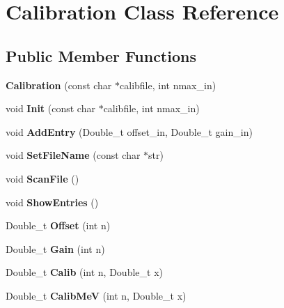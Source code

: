 \hypertarget{classCalibration}{
\section{Calibration Class Reference}
\label{classCalibration}
}
\subsection*{Public Member Functions}
\begin{DoxyCompactItemize}
\item 
\hypertarget{classCalibration_adaaabbe555e8d9719c11c107f159ac47}{
{\bfseries Calibration} (const char $\ast$calibfile, int nmax\_\-in)}
\label{classCalibration_adaaabbe555e8d9719c11c107f159ac47}

\item 
\hypertarget{classCalibration_a966d1e3e9245fac48630971352d5cf75}{
void {\bfseries Init} (const char $\ast$calibfile, int nmax\_\-in)}
\label{classCalibration_a966d1e3e9245fac48630971352d5cf75}

\item 
\hypertarget{classCalibration_a2bd0b414967077e2b74a9128e4283d1d}{
void {\bfseries AddEntry} (Double\_\-t offset\_\-in, Double\_\-t gain\_\-in)}
\label{classCalibration_a2bd0b414967077e2b74a9128e4283d1d}

\item 
\hypertarget{classCalibration_a67c91bbbdbabe61d67b45846b40dbdf7}{
void {\bfseries SetFileName} (const char $\ast$str)}
\label{classCalibration_a67c91bbbdbabe61d67b45846b40dbdf7}

\item 
\hypertarget{classCalibration_a3781a3216c77723f53d77326e73d9a40}{
void {\bfseries ScanFile} ()}
\label{classCalibration_a3781a3216c77723f53d77326e73d9a40}

\item 
\hypertarget{classCalibration_a53ed568f0b99113fa6167d26edabcc63}{
void {\bfseries ShowEntries} ()}
\label{classCalibration_a53ed568f0b99113fa6167d26edabcc63}

\item 
\hypertarget{classCalibration_a91049e28bbc2e5350e5997920e817928}{
Double\_\-t {\bfseries Offset} (int n)}
\label{classCalibration_a91049e28bbc2e5350e5997920e817928}

\item 
\hypertarget{classCalibration_ad7991a411ac85f669d9c76dcc12fdc5a}{
Double\_\-t {\bfseries Gain} (int n)}
\label{classCalibration_ad7991a411ac85f669d9c76dcc12fdc5a}

\item 
\hypertarget{classCalibration_aaaae079278b29d1218666ae85fecca7c}{
Double\_\-t {\bfseries Calib} (int n, Double\_\-t x)}
\label{classCalibration_aaaae079278b29d1218666ae85fecca7c}

\item 
\hypertarget{classCalibration_a68384013436926d7cfd91db13753c017}{
Double\_\-t {\bfseries CalibMeV} (int n, Double\_\-t x)}
\label{classCalibration_a68384013436926d7cfd91db13753c017}

\end{DoxyCompactItemize}


